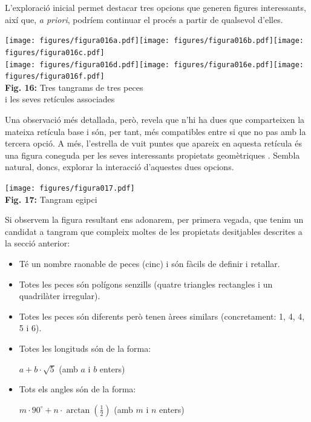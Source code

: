 \documentclass[a4paper,11pt]{article}
\begin{document}
\begin{multicols}{2}
            L'exploració inicial permet destacar tres opcions que generen figures interessants, així que, \emph{a priori}, podríem continuar el procés a partir de qualsevol d'elles.

            \begin{center}
                \texttt{[image: figures/figura016a.pdf]}\quad\texttt{[image: figures/figura016b.pdf]}\quad\texttt{[image: figures/figura016c.pdf]} \\ \medskip
                \texttt{[image: figures/figura016d.pdf]}\quad\texttt{[image: figures/figura016e.pdf]}\quad\texttt{[image: figures/figura016f.pdf]} \\
                \footnotesize{\textbf{Fig. 16:} Tres tangrams de tres peces\\ i les seves retícules associades}
            \end{center}

            Una observació més detallada, però, revela que n'hi ha dues que comparteixen la mateixa retícula base i són, per tant, més compatibles entre si que no pas amb la tercera opció. A més, l'estrella de vuit puntes que apareix en aquesta retícula és una figura coneguda per les seves interessants propietats geomètriques \cite{pol1998nucli}. Sembla natural, doncs, explorar la interacció d'aquestes dues opcions.

            \begin{center}
                \texttt{[image: figures/figura017.pdf]} \\
                \footnotesize{\textbf{Fig. 17:} Tangram egipci}
            \end{center}

            Si observem la figura resultant ens adonarem, per primera vegada, que tenim un candidat a tangram que compleix moltes de les propietats desitjables descrites a la secció anterior:

            \begin{itemize}
                \item Té un nombre raonable de peces (cinc) i són fàcils de definir i retallar.
                \item Totes les peces són polígons senzills (quatre triangles rectangles i un quadrilàter irregular).
                \item Totes les peces són diferents però tenen àrees similars (concretament: 1, 4, 4, 5 i 6).
                \item Totes les longituds són de la forma:
                    \begin{center}$a + b \cdot \sqrt{5}$ \qquad(amb $a$ i $b$ enters)\end{center}
                \item Tots els angles són de la forma:
                    \begin{center}$m \cdot 90^\circ + n \cdot \arctan{(\tfrac{1}{2})}$ \quad(amb $m$ i $n$ enters)\end{center}
            \end{itemize}


\end{multicols}
\end{document}
